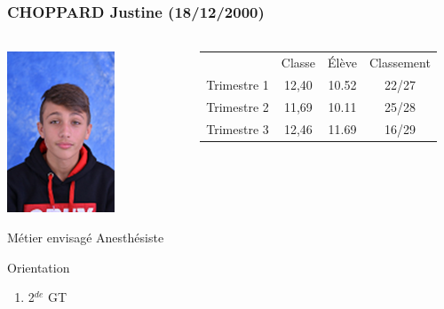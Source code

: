 \documentclass{beamer}
\begin{document}
\begin{frame}
	\frametitle{CHOPPARD Justine (18/12/2000)}  
	\framesubtitle{ }	
	
	
	\begin{columns}[onlytextwidth]
		
		
		
		\begin{column}{0.3\textwidth}
			\vspace*{-.5cm}
			\begin{center}
				\includegraphics[scale=0.7]{tof}
			\end{center}
			
			
			\begin{block}{Métier envisagé}
				Anesthésiste
			\end{block}
			
			\begin{alertblock}{Orientation}
				\begin{enumerate}
					\item 2$^{de}$ GT
				\end{enumerate}
			\end{alertblock}
			
			
		\end{column}	
		
	\begin{column}{0.70\textwidth}
		
		\begin{center}
			
			\vspace*{-.7cm}	
			
			{\small \begin{tabular}{cccc}
					& Classe                       & \'Elève                      & Classement                   \\
					{\color[HTML]{00009B} Trimestre 1} & {\color[HTML]{00009B} 12,40} & {\color[HTML]{00009B} 10.52} & {\color[HTML]{00009B} 22/27} \\
					{\color[HTML]{FE0000} Trimestre 2} & {\color[HTML]{FE0000} 11,69} & {\color[HTML]{FE0000} 10.11} & {\color[HTML]{FE0000} 25/28} \\
					{\color[HTML]{34FF34} Trimestre 3} & {\color[HTML]{34FF34} 12,46} & {\color[HTML]{34FF34} 11.69} & {\color[HTML]{34FF34} 16/29}
				\end{tabular}}
				

\end{center}
\end{column}
\end{columns}
\end{frame}
\end{document}
